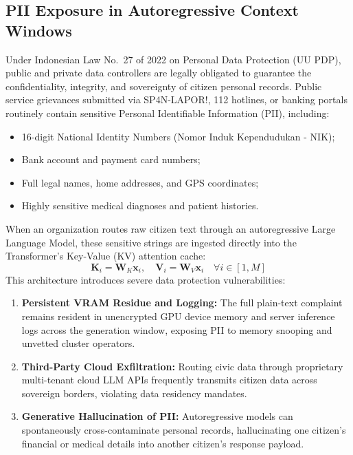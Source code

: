\documentclass[journal,compsoc]{IEEEtran}
\begin{document}
\subsection{PII Exposure in Autoregressive Context Windows}
Under Indonesian Law No.~27 of 2022 on Personal Data Protection (UU PDP), public and private data controllers are legally obligated to guarantee the confidentiality, integrity, and sovereignty of citizen personal records. Public service grievances submitted via SP4N-LAPOR!, 112 hotlines, or banking portals routinely contain sensitive Personal Identifiable Information (PII), including:
\begin{itemize}
    \item 16-digit National Identity Numbers (Nomor Induk Kependudukan - NIK);
    \item Bank account and payment card numbers;
    \item Full legal names, home addresses, and GPS coordinates;
    \item Highly sensitive medical diagnoses and patient histories.
\end{itemize}

When an organization routes raw citizen text through an autoregressive Large Language Model, these sensitive strings are ingested directly into the Transformer's Key-Value (KV) attention cache:
\begin{equation}
\mathbf{K}_i = \mathbf{W}_K \mathbf{x}_i, \quad \mathbf{V}_i = \mathbf{W}_V \mathbf{x}_i \quad \forall i \in [1, M]
\end{equation}
This architecture introduces severe data protection vulnerabilities:
\begin{enumerate}
    \item \textbf{Persistent VRAM Residue and Logging:} The full plain-text complaint remains resident in unencrypted GPU device memory and server inference logs across the generation window, exposing PII to memory snooping and unvetted cluster operators.
    \item \textbf{Third-Party Cloud Exfiltration:} Routing civic data through proprietary multi-tenant cloud LLM APIs frequently transmits citizen data across sovereign borders, violating data residency mandates.
    \item \textbf{Generative Hallucination of PII:} Autoregressive models can spontaneously cross-contaminate personal records, hallucinating one citizen's financial or medical details into another citizen's response payload.
\end{enumerate}
\end{document}
